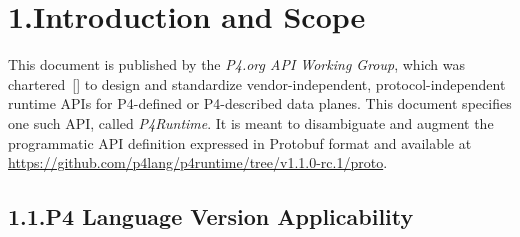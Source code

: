 \documentclass[11pt]{article}
\begin{document}
{\begin{mdtoc}
\begin{mdtocblock}%







\end{mdtocblock}%
\end{mdtoc}%

\section{1.\hspace*{0.5em}Introduction and Scope}\label{sec-introduction-and-scope}%

\noindent{}This document is published by the \emph{P4.org API Working Group}, which was
chartered~[] to design and standardize vendor-independent,
protocol-independent runtime APIs for P4-defined or P4-described data
planes. This document specifies one such API, called \emph{P4Runtime}. It is meant to
disambiguate and augment the programmatic API definition expressed in Protobuf
format and available at
\href{https://github.com/p4lang/p4runtime/tree/v1.1.0-rc.1/proto}{https://github.com/p4lang/p4runtime/tree/v1.1.0-rc.1/proto}.%

\subsection{1.1.\hspace*{0.5em}P4 Language Version Applicability}\label{sec-p4-language-version-applicability}%

}
\end{document}
